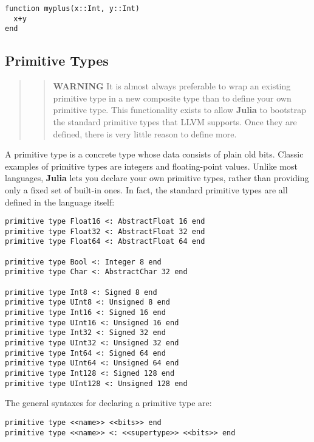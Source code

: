 \documentclass[
]{article}
\begin{document}
\begin{verbatim}
function myplus(x::Int, y::Int)
  x+y
end
\end{verbatim}

\hypertarget{primitive-types}{%
\subsection{Primitive Types}\label{primitive-types}}

\begin{quote}
\begin{quote}
\textbf{WARNING} It is almost always preferable to wrap an existing
primitive type in a new composite type than to define your own primitive
type. This functionality exists to allow \textbf{Julia} to bootstrap the
standard primitive types that LLVM supports. Once they are defined,
there is very little reason to define more.
\end{quote}
\end{quote}

A primitive type is a concrete type whose data consists of plain old
bits. Classic examples of primitive types are integers and
floating-point values. Unlike most languages, \textbf{Julia} lets you
declare your own primitive types, rather than providing only a fixed set
of built-in ones. In fact, the standard primitive types are all defined
in the language itself:

\begin{verbatim}
primitive type Float16 <: AbstractFloat 16 end
primitive type Float32 <: AbstractFloat 32 end
primitive type Float64 <: AbstractFloat 64 end

primitive type Bool <: Integer 8 end
primitive type Char <: AbstractChar 32 end

primitive type Int8 <: Signed 8 end
primitive type UInt8 <: Unsigned 8 end
primitive type Int16 <: Signed 16 end
primitive type UInt16 <: Unsigned 16 end
primitive type Int32 <: Signed 32 end
primitive type UInt32 <: Unsigned 32 end
primitive type Int64 <: Signed 64 end
primitive type UInt64 <: Unsigned 64 end
primitive type Int128 <: Signed 128 end
primitive type UInt128 <: Unsigned 128 end
\end{verbatim}

The general syntaxes for declaring a primitive type are:

\begin{verbatim}
primitive type <<name>> <<bits>> end
primitive type <<name>> <: <<supertype>> <<bits>> end
\end{verbatim}
\end{document}
